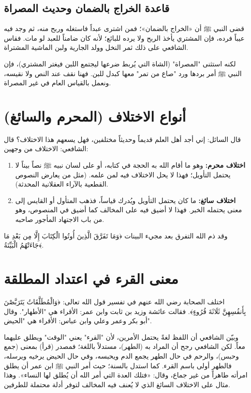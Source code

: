 \subsection{قاعدة الخراج بالضمان وحديث المصراة}
قضى النبي ﷺ أن «الخراج بالضمان»؛ فمن اشترى عبداً فاستغله وربح منه، ثم وجد فيه عيباً فرده، فإن المشتري يأخذ الربح ولا يرده للبائع؛ لأنه كان ضامناً للعبد لو مات. فقاس الشافعي على ذلك ثمر النخل وولد الجارية ولبن الماشية المشتراة.

لكنه استثنى "المصراة" (الشاة التي يُربط ضرعها ليجتمع اللبن فيغتر المشتري)، فإن النبي ﷺ أمر بردها ورد "صاع من تمر" معها كبدل للبن. فهنا نقف عند النص ولا نقيسه، ونعمل بالقياس العام في غير المصراة.

\section{أنواع الاختلاف (المحرم والسائغ)}
قال السائل: إني أجد أهل العلم قديماً وحديثاً مختلفين، فهل يسعهم هذا الاختلاف؟
قال الشافعي: الاختلاف من وجهين:
\begin{enumerate}
    \item \textbf{اختلاف محرم:} وهو ما أقام الله به الحجة في كتابه، أو على لسان نبيه ﷺ نصاً بيناً لا يحتمل التأويل؛ فهذا لا يحل الاختلاف فيه لمن علمه. (مثل من يعارض النصوص القطعية بالآراء العقلانية المحدثة).
    \item \textbf{اختلاف سائغ:} ما كان يحتمل التأويل ويُدرك قياساً، فذهب المتأول أو القايس إلى معنى يحتمله الخبر. فهذا لا أضيق فيه على المخالف كما أضيق في المنصوص، وهو من باب الاجتهاد المأجور صاحبه.
\end{enumerate}
وقد ذم الله التفرق بعد مجيء البينات ﴿وَمَا تَفَرَّقَ الَّذِينَ أُوتُوا الْكِتَابَ إِلَّا مِن بَعْدِ مَا جَاءَتْهُمُ الْبَيِّنَةُ﴾.

\section{معنى القرء في اعتداد المطلقة}
اختلف الصحابة رضي الله عنهم في تفسير قول الله تعالى: ﴿وَالْمُطَلَّقَاتُ يَتَرَبَّصْنَ بِأَنفُسِهِنَّ ثَلَاثَةَ قُرُوءٍ﴾. 
فقالت عائشة وزيد بن ثابت وابن عمر: الأقراء هي "الأطهار". 
وقال أبو بكر وعمر وعلي وابن عباس: الأقراء هي "الحيض".

وبيّن الشافعي أن اللفظ لغةً يحتمل الأمرين، لأن "القرء" يعني "الوقت" ويطلق عليهما معاً. لكن الشافعي رجح أن المراد به (الطهر)، مستدلاً باللغة؛ فمصدر (قرأ) بمعنى (جمع وحبس)، والرحم في حال الطهر يجمع الدم ويحبسه، وفي حال الحيض يرخيه ويرسله، فالطهر أولى باسم القرء.
كما استدل بالسنة؛ حيث أمر النبي ﷺ ابن عمر أن يطلق امرأته طاهراً من غير جماع، وقال: «فتلك العدة التي أمر الله أن يُطلق لها النساء».
وهذا مثال على الاختلاف السائغ الذي لا يُعنف فيه المخالف لتوفر أدلة محتملة للطرفين.